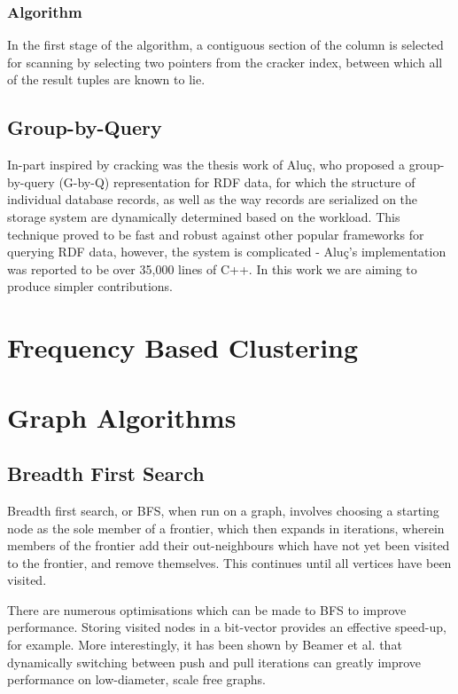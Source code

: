 \subsubsection{Algorithm}

In the first stage of the algorithm, a contiguous section of the column is selected for scanning by
selecting two pointers from the cracker index, between which all of the result tuples are known to
lie.

\subsection{Group-by-Query}

In-part inspired by cracking was the thesis work of Aluç, who proposed a group-by-query (G-by-Q)
representation for RDF data, for which the structure of individual database records, as well as
the way records are serialized on the storage system are dynamically determined based on the
workload. This technique proved to be fast and robust against other popular frameworks for
querying RDF data, however, the system is complicated - Aluç's implementation was reported to be
over 35,000 lines of C++. In this work we are aiming to produce simpler contributions.

\section{Frequency Based Clustering}

\section{Graph Algorithms}

\subsection{Breadth First Search}

Breadth first search, or BFS, when run on a graph, involves choosing a starting node as the sole
member of a frontier, which then expands in iterations, wherein members of the frontier add their
out-neighbours which have not yet been visited to the frontier, and remove themselves. This continues
until all vertices have been visited.

There are numerous optimisations which can be made to BFS to improve performance. Storing visited
nodes in a bit-vector provides an effective speed-up, for example. More interestingly, it has been
shown by Beamer et al. that dynamically switching between push and pull iterations can greatly
improve performance on low-diameter, scale free graphs.

